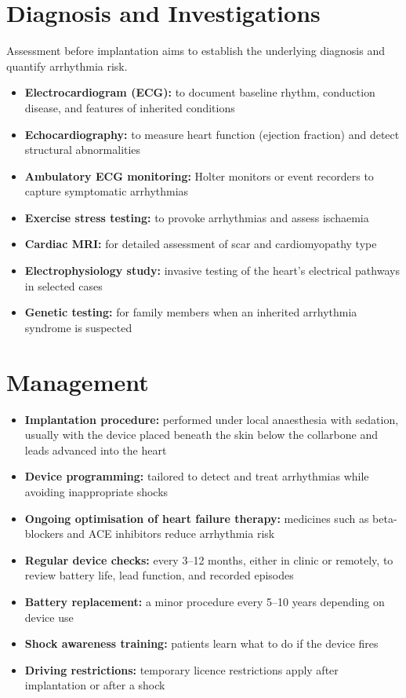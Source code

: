 \section*{Diagnosis and Investigations}
Assessment before implantation aims to establish the underlying diagnosis and quantify arrhythmia risk.
\begin{itemize}
    \item \textbf{Electrocardiogram (ECG):} to document baseline rhythm, conduction disease, and features of inherited conditions
    \item \textbf{Echocardiography:} to measure heart function (ejection fraction) and detect structural abnormalities
    \item \textbf{Ambulatory ECG monitoring:} Holter monitors or event recorders to capture symptomatic arrhythmias
    \item \textbf{Exercise stress testing:} to provoke arrhythmias and assess ischaemia
    \item \textbf{Cardiac MRI:} for detailed assessment of scar and cardiomyopathy type
    \item \textbf{Electrophysiology study:} invasive testing of the heart's electrical pathways in selected cases
    \item \textbf{Genetic testing:} for family members when an inherited arrhythmia syndrome is suspected
\end{itemize}

\section*{Management}
\begin{itemize}
    \item \textbf{Implantation procedure:} performed under local anaesthesia with sedation, usually with the device placed beneath the skin below the collarbone and leads advanced into the heart
    \item \textbf{Device programming:} tailored to detect and treat arrhythmias while avoiding inappropriate shocks
    \item \textbf{Ongoing optimisation of heart failure therapy:} medicines such as beta-blockers and ACE inhibitors reduce arrhythmia risk
    \item \textbf{Regular device checks:} every 3--12 months, either in clinic or remotely, to review battery life, lead function, and recorded episodes
    \item \textbf{Battery replacement:} a minor procedure every 5--10 years depending on device use
    \item \textbf{Shock awareness training:} patients learn what to do if the device fires
    \item \textbf{Driving restrictions:} temporary licence restrictions apply after implantation or after a shock
\end{itemize}


